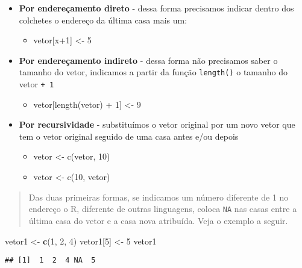 \documentclass[]{book}
\newenvironment{Shaded}{\begin{snugshade}}{\end{snugshade}}
\newcommand{\DecValTok}[1]{\textcolor[rgb]{0.00,0.00,0.81}{#1}}
\newcommand{\KeywordTok}[1]{\textcolor[rgb]{0.13,0.29,0.53}{\textbf{#1}}}
\newcommand{\NormalTok}[1]{#1}
\newcommand{\StringTok}[1]{\textcolor[rgb]{0.31,0.60,0.02}{#1}}
\providecommand{\tightlist}{%
  \setlength{\itemsep}{0pt}\setlength{\parskip}{0pt}}
\theoremstyle{definition}
\theoremstyle{definition}
\theoremstyle{definition}
\theoremstyle{remark}
\begin{document}
\begin{itemize}
\tightlist
\item
  \textbf{Por endereçamento direto} - dessa forma precisamos indicar dentro dos colchetes o endereço da última casa mais um:

  \begin{itemize}
  \tightlist
  \item
    vetor{[}x+1{]} \textless{}- 5
  \end{itemize}
\item
  \textbf{Por endereçamento indireto} - dessa forma não precisamos saber o tamanho do vetor, indicamos a partir da função \texttt{length()} o tamanho do vetor \texttt{+\ 1}

  \begin{itemize}
  \tightlist
  \item
    vetor{[}length(vetor) + 1{]} \textless{}- 9
  \end{itemize}
\item
  \textbf{Por recursividade} - substituímos o vetor original por um novo vetor que tem o vetor original seguido de uma casa antes e/ou depois

  \begin{itemize}
  \tightlist
  \item
    vetor \textless{}- c(vetor, 10)
  \item
    vetor \textless{}- c(10, vetor)
  \end{itemize}
\end{itemize}

\begin{quote}
Das duas primeiras formas, se indicamos um número diferente de 1 no endereço o R, diferente de outras linguagens, coloca \texttt{NA} nas casas entre a última casa do vetor e a casa nova atribuída. Veja o exemplo a seguir.
\end{quote}

\begin{Shaded}
\begin{Highlighting}[]
\NormalTok{vetor1 <-}\StringTok{ }\KeywordTok{c}\NormalTok{(}\DecValTok{1}\NormalTok{, }\DecValTok{2}\NormalTok{, }\DecValTok{4}\NormalTok{)}
\NormalTok{vetor1[}\DecValTok{5}\NormalTok{] <-}\StringTok{ }\DecValTok{5}
\NormalTok{vetor1}
\end{Highlighting}
\end{Shaded}

\begin{verbatim}
## [1]  1  2  4 NA  5
\end{verbatim}
\end{document}
